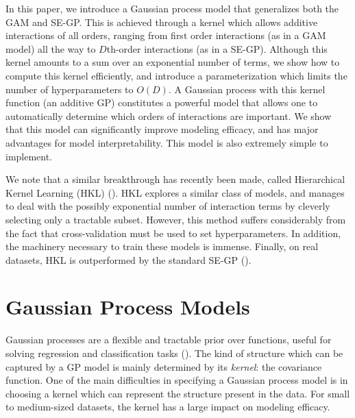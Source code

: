 In this paper, we introduce a Gaussian process model that generalizes both the GAM and SE-GP.  This is achieved through a kernel which allows additive interactions of all orders, ranging from first order interactions (as in a GAM model) all the way to $D$th-order interactions (as in a SE-GP).  Although this kernel amounts to a sum over an exponential number of terms, we show how to compute this kernel efficiently, and introduce a parameterization which limits the number of hyperparameters to $O(D)$.  A Gaussian process with this kernel function (an additive GP) constitutes a powerful model that allows one to automatically determine which orders of interactions are important.  We show that this model can significantly improve modeling efficacy, and has major advantages for model interpretability.  This model is also extremely simple to implement.

We note that a similar breakthrough has recently been made, called Hierarchical Kernel Learning (HKL) (\cite{DBLP:journals/corr/abs-0909-0844}).  HKL explores a similar class of models, and manages to deal with the possibly exponential number of interaction terms by cleverly selecting only a tractable subset.  However, this method suffers considerably from the fact that cross-validation must be used to set hyperparameters.  In addition, the machinery necessary to train these models is immense.  Finally, on real datasets, HKL is outperformed by the standard SE-GP (\cite{DBLP:journals/corr/abs-0909-0844}).

\section{Gaussian Process Models}

Gaussian processes are a flexible and tractable prior over functions, useful for solving regression and classification tasks (\cite{rasmussen38gaussian}).  The kind of structure which can be captured by a GP model is mainly determined by its \emph{kernel}: the covariance function.  One of the main difficulties in specifying a Gaussian process model is in choosing a kernel which can represent the structure present in the data.  For small to medium-sized datasets, the kernel has a large impact on modeling efficacy.
  

